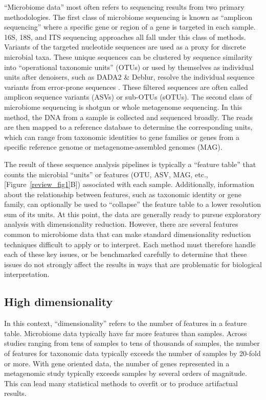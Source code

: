 “Microbiome data” most often refers to sequencing results from two primary methodologies. The first class of microbiome sequencing is known as “amplicon sequencing” where a specific gene or region of a gene is targeted in each sample. 16S, 18S, and ITS sequencing approaches all fall under this class of methods. Variants of the targeted nucleotide sequences are used as a proxy for discrete microbial taxa. These unique sequences can be clustered by sequence similarity into “operational taxonomic units” (OTUs) or used by themselves as individual units after denoisers, such as DADA2 & Deblur, resolve the individual sequence variants from error-prone sequences \cite{Callahan2017-ap,Amir2017-sk}. These filtered sequences are often called amplicon sequence variants (ASVs) \cite{Callahan2017-ap} or sub-OTUs (sOTUs). The second class of microbiome sequencing is shotgun or whole metagenome sequencing. In this method, the DNA from a sample is collected and sequenced broadly. The reads are then mapped to a reference database to determine the corresponding units, which can range from taxonomic identities to gene families or genes from a specific reference genome or metagenome-assembled genomes (MAG).

The result of these sequence analysis pipelines is typically a “feature table” that counts the microbial “units” or features (OTU, ASV, MAG, etc., [Figure~\ref{review_fig1}B]) associated with each sample. Additionally, information about the relationship between features, such as taxonomic identity or gene family, can optionally be used to “collapse” the feature table to a lower resolution sum of its units.  At this point, the data are generally ready to pursue exploratory analysis with dimensionality reduction. 
However, there are several  features common to  microbiome data that can make standard dimensionality reduction techniques difficult to apply or to interpret. Each method must therefore handle each of these key issues, or be benchmarked carefully to determine that these issues do not strongly affect the results in ways that are problematic for biological interpretation.

\subsection{High dimensionality} In this context, “dimensionality” refers to the number of features in a feature table. Microbiome data typically have far more features than samples. Across studies ranging from tens of samples to tens of thousands of samples, the number of features for taxonomic data typically exceeds the number of samples by 20-fold or more. With gene oriented data, the number of genes represented in a metagenomic study typically exceeds samples by several orders of magnitude. This can lead many statistical methods to overfit or to produce artifactual results.

